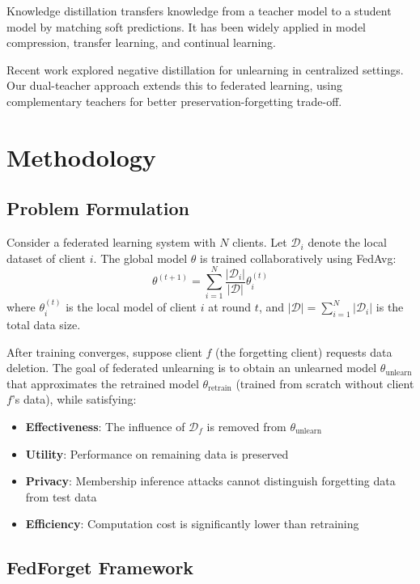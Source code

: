 \documentclass[10pt,twocolumn]{article}
\begin{document}
Knowledge distillation transfers knowledge from a teacher model to a student model by matching soft predictions. It has been widely applied in model compression, transfer learning, and continual learning.

Recent work explored negative distillation for unlearning in centralized settings. Our dual-teacher approach extends this to federated learning, using complementary teachers for better preservation-forgetting trade-off.

\section{Methodology}

\subsection{Problem Formulation}

Consider a federated learning system with $N$ clients. Let $\mathcal{D}_i$ denote the local dataset of client $i$. The global model $\theta$ is trained collaboratively using FedAvg:
\begin{equation}
\theta^{(t+1)} = \sum_{i=1}^{N} \frac{|\mathcal{D}_i|}{|\mathcal{D}|} \theta_i^{(t)}
\end{equation}
where $\theta_i^{(t)}$ is the local model of client $i$ at round $t$, and $|\mathcal{D}| = \sum_{i=1}^{N} |\mathcal{D}_i|$ is the total data size.

After training converges, suppose client $f$ (the forgetting client) requests data deletion. The goal of federated unlearning is to obtain an unlearned model $\theta_{\text{unlearn}}$ that approximates the retrained model $\theta_{\text{retrain}}$ (trained from scratch without client $f$'s data), while satisfying:

\begin{itemize}
\item \textbf{Effectiveness}: The influence of $\mathcal{D}_f$ is removed from $\theta_{\text{unlearn}}$
\item \textbf{Utility}: Performance on remaining data is preserved
\item \textbf{Privacy}: Membership inference attacks cannot distinguish forgetting data from test data
\item \textbf{Efficiency}: Computation cost is significantly lower than retraining
\end{itemize}

\subsection{FedForget Framework}
\end{document}
